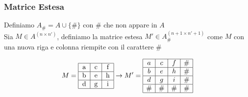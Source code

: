 \documentclass{beamer}
\begin{document}


\begin{frame}
\frametitle{Matrice Estesa}

\begin{definition}
Definiamo $A_\# = A \cup\{\#\}$ con $\#$ che non appare in $A$\\
Sia $M \in A^{(n\times n')}$, definiamo la matrice estesa $M' \in A_\# ^{(n+1 \times n'+1)}$ come $M$ con una nuova riga e colonna riempite con il carattere $\#$
\end{definition}

\[
  M = \begin{tabular} {|c|c|c|}
  	\hline
  		a & c & f  \\ 
  		\hline
  		b & e & h \\
  		\hline
  		d & g & i \\
  		\hline 
  \end{tabular} 
  \to M' = 
 \begin{array} {|c|c|c|c|}
 \hline
   		a & c & f & \# \\ 
   		\hline
   		b & e & h & \# \\
   		\hline
   		d & g & i  & \# \\
   		\hline
   		\# & \# & \# & \#\\
		\hline
   \end{array} 
\]


\end{frame}
\end{document}
